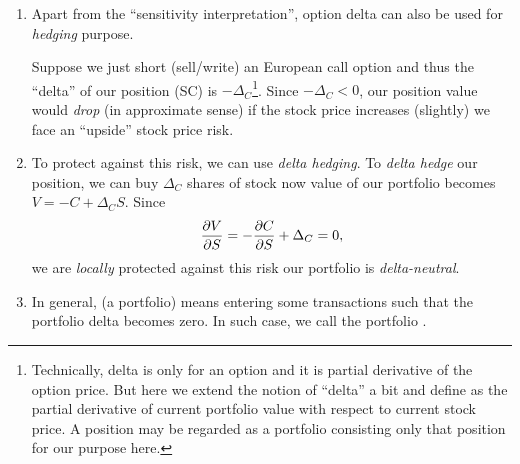 \begin{enumerate}
\item Apart from the ``sensitivity interpretation'', option delta can also be
used for \emph{hedging} purpose.

Suppose we just short (sell/write) an European call option and thus the
``delta'' of our position (SC) is \(-\Delta_C\)\footnote{Technically, delta is
only for an option and it is partial derivative of the option price. But here
we extend the notion of ``delta'' a bit and define  as
the partial derivative of current portfolio value with respect to current stock
price. A position may be regarded as a portfolio consisting only that position
for our purpose here.}. Since \(-\Delta_C<0\), our position value would
\emph{drop} (in approximate sense) if the stock price increases (slightly)
 we face an ``upside'' stock price risk.

\item To protect against this risk, we can use \emph{delta hedging}. To
\emph{delta hedge} our position, we can buy \(\Delta_C\) shares of stock now
 value of our portfolio becomes \(V=-C+\Delta_C S\). Since
\[
\pdv{V}{S}=-\pdv{C}{S}+\Delta_C=0,
\]
we are \emph{locally} protected against this risk  our
portfolio is \emph{delta-neutral}.

\item In general,  (a portfolio) means entering some
transactions such that the portfolio delta becomes zero. In such case, we call
the portfolio .
\end{enumerate}

